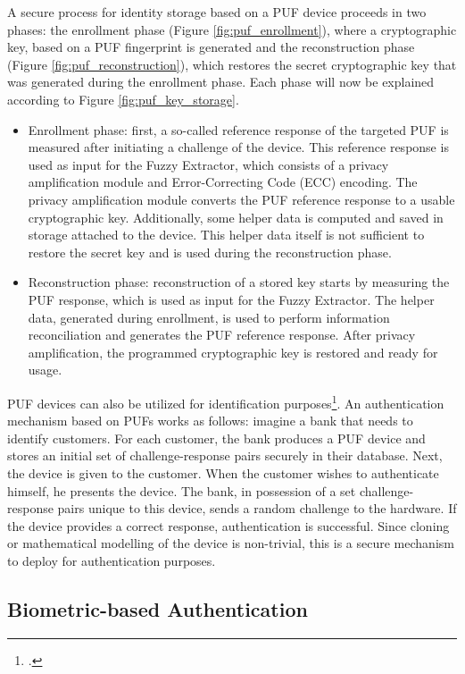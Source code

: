 \documentclass[USenglish]{article}
\begin{document}
A secure process for identity storage based on a PUF device proceeds in two phases: the enrollment phase (Figure \ref{fig:puf_enrollment}), where a cryptographic key, based on a PUF fingerprint is generated and the reconstruction phase (Figure \ref{fig:puf_reconstruction}), which restores the secret cryptographic key that was generated during the enrollment phase.
Each phase will now be explained according to Figure \ref{fig:puf_key_storage}.
\begin{itemize}
	\item Enrollment phase: first, a so-called reference response of the targeted PUF is measured after initiating a challenge of the device. This reference response is used as input for the Fuzzy Extractor, which consists of a privacy amplification module and Error-Correcting Code (ECC) encoding. The privacy amplification module converts the PUF reference response to a usable cryptographic key. Additionally, some helper data is computed and saved in storage attached to the device. This helper data itself is not sufficient to restore the secret key and is used during the reconstruction phase.
	\item Reconstruction phase: reconstruction of a stored key starts by measuring the PUF response, which is used as input for the Fuzzy Extractor. The helper data, generated during enrollment, is used to perform information reconciliation and generates the PUF reference response. After privacy amplification, the programmed cryptographic key is restored and ready for usage.
\end{itemize}

PUF devices can also be utilized for identification purposes\footcite{vskoric2005robust}.
An authentication mechanism based on PUFs works as follows: imagine a bank that needs to identify customers.
For each customer, the bank produces a PUF device and stores an initial set of challenge-response pairs securely in their database.
Next, the device is given to the customer.
When the customer wishes to authenticate himself, he presents the device.
The bank, in possession of a set challenge-response pairs unique to this device, sends a random challenge to the hardware.
If the device provides a correct response, authentication is successful.
Since cloning or mathematical modelling of the device is non-trivial, this is a secure mechanism to deploy for authentication purposes.

\subsection{Biometric-based Authentication}
\end{document}
